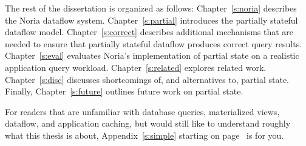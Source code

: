 The rest of the dissertation is organized as follows: Chapter~\ref{s:noria}
describes the Noria dataflow system. Chapter~\ref{s:partial} introduces the
partially stateful dataflow model. Chapter~\ref{s:correct} describes additional
mechanisms that are needed to ensure that partially stateful dataflow produces
correct query results. Chapter~\ref{s:eval} evaluates Noria's implementation of
partial state on a realistic application query workload. Chapter~\ref{s:related}
explores related work. Chapter~\ref{s:disc} discusses shortcomings of, and
alternatives to, partial state. Finally, Chapter~\ref{s:future} outlines future
work on partial state.

For readers that are unfamiliar with database queries, materialized views,
dataflow, and application caching, but would still like to understand roughly
what this thesis is about, Appendix~\ref{s:simple} starting on
page~\pageref{s:simple} is for you.
